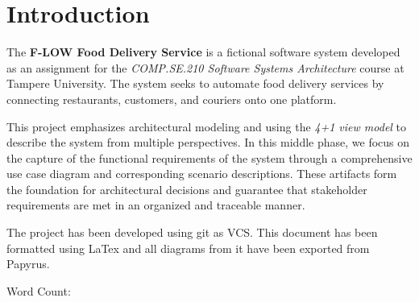 \section{Introduction}

The \textbf{F-LOW Food Delivery Service} is a fictional software system developed as an assignment for the \textit{COMP.SE.210 Software Systems Architecture} course at Tampere University. The system seeks to automate food delivery services by connecting restaurants, customers, and couriers onto one platform.

This project emphasizes architectural modeling and using the \textit{4+1 view model} to describe the system from multiple perspectives. In this middle phase, we focus on the capture of the functional requirements of the system through a comprehensive use case diagram and corresponding scenario descriptions. These artifacts form the foundation for architectural decisions and guarantee that stakeholder requirements are met in an organized and traceable manner.

The project has been developed using git as VCS. This document has been formatted using LaTex and all diagrams from it have been exported from Papyrus.

Word Count: 
